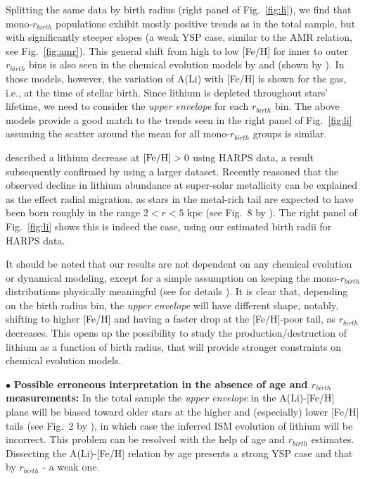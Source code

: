 \documentclass[usenatbib]{mnras}
\begin{document}
Splitting the same data by birth radius (right panel of Fig.~\ref{fig:li}), we find that mono-$r_{birth}$ populations exhibit mostly positive trends as in the total sample, but with significantly steeper slopes (a weak YSP case, similar to the AMR relation, see Fig.~\ref{fig:amr}). This general shift from high to low [Fe/H] for inner to outer $r_{birth}$ bins is also seen in the chemical evolution models by \cite{prantzos17} and \cite{chiappini09a} (shown by \citealt{guiglion19}). In those models, however, the variation of A(Li) with [Fe/H] is shown for the gas, i.e., at the time of stellar birth. Since lithium is depleted throughout stars' lifetime, we need to consider the {\it upper envelope} for each $r_{birth}$ bin. The above models provide a good match to the trends seen in the right panel of Fig.~\ref{fig:li} assuming the scatter around the mean for all mono-$r_{birth}$ groups is similar. 

\cite{delgadomena15} described a lithium decrease at $\rm[Fe/H] > 0$ using HARPS data, a result subsequently confirmed by \cite{guiglion16} using a larger dataset. Recently \cite{guiglion19} reasoned that the observed decline in lithium abundance at super-solar metallicity can be explained as the effect radial migration, as stars in the metal-rich tail are expected to have been born roughly in the range $2<r<5$ kpc (see Fig.~8 by \citealt{minchev18}). The right panel of Fig.~\ref{fig:li} shows this is indeed the case, using our estimated birth radii for HARPS data.

It should be noted that our results are not dependent on any chemical evolution or dynamical modeling, except for a simple assumption on keeping the mono-$r_{birth}$ distributions physically meaningful (see for details \citealt{minchev18}). It is clear that, depending on the birth radius bin, the {\it upper envelope} will have different shape, notably, shifting to higher [Fe/H] and having a faster drop at the [Fe/H]-poor tail, as $r_{birth}$ decreases. This opens up the possibility to study the production/destruction of lithium as a function of birth radius, that will provide stronger constraints on chemical evolution models.


$\bullet$ {\bf Possible erroneous interpretation in the absence of age and $r_{birth}$ measurements:}
In the total sample the {\it upper envelope} in the A(Li)-[Fe/H] plane will be biased toward older stars at the higher and (especially) lower [Fe/H] tails (see Fig.~2 by \citealt{minchev18}), in which case the inferred ISM evolution of lithium will be incorrect. This problem can be resolved with the help of age and $r_{birth}$ estimates. Dissecting the A(Li)-[Fe/H] relation by age presents a strong YSP case and that by $r_{birth}$ - a weak one.
\end{document}
